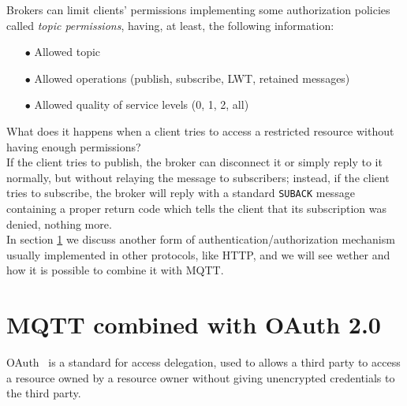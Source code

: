 \documentclass[12pt]{report}
\begin{document}
{{Brokers can limit clients' permissions implementing some authorization policies called \emph{topic permissions}, having, at least, the following information:

\begin{itemize}
\setlength{\itemindent}{+4mm}
  \item[$\bullet$] Allowed topic
  \item[$\bullet$] Allowed operations (publish, subscribe, LWT, retained messages)
  \item[$\bullet$] Allowed quality of service levels (0, 1, 2, all)
\end{itemize}

What does it happens when a client tries to access a restricted resource without having enough permissions?\\

If the client tries to publish, the broker can disconnect it or simply reply to it normally, but without relaying the message to subscribers; instead, if the client tries to subscribe, the broker will reply with a standard \texttt{SUBACK} message containing a proper return code which tells the client that its subscription was denied, nothing more.\\

In section \ref{sec:mqttauth2} we discuss another form of authentication/authorization mechanism usually implemented in other protocols, like HTTP, and we will see wether and how it is possible to combine it with MQTT. 

\section{MQTT combined with OAuth 2.0}
\label{sec:mqttauth2}
\bigskip
OAuth~\cite{oauthwiki} is a standard for access delegation, used to allows a third party to access a resource owned by a resource owner without giving unencrypted credentials to the third party.

}}
\end{document}
